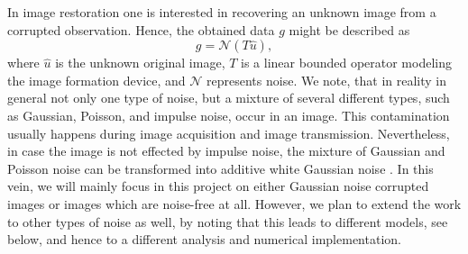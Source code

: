 \documentclass[enabledeprecatedfontcommands,cleardoublepage=empty,headsepline,twoside,11pt,DIV=15,BCOR=12mm,final]{scrartcl}
\begin{document}
In image restoration one is interested in recovering an unknown image from a corrupted observation. Hence, the obtained data $g$ might be described as
$$
g=\mathcal{N}(T\hat{u}),
$$
where $\hat{u}$ is the unknown original image, $T$ is a linear bounded operator modeling the image formation device, and $\mathcal{N}$ represents noise. %
We note, that in reality in general not only one type of noise, but a mixture of several different types, such as Gaussian, Poisson, and impulse noise, occur in an image. This contamination usually happens during image acquisition and image transmission. Nevertheless, in case the image is not effected by impulse noise, the mixture of Gaussian and Poisson noise can be transformed into additive white Gaussian noise \cite{}. In this vein, we will mainly focus in this project on either  Gaussian noise corrupted images or images which are noise-free at all. However, we plan to extend the work to other types of noise as well, by noting that this leads to different models, see below, and hence to a different analysis and numerical implementation. 
\end{document}
